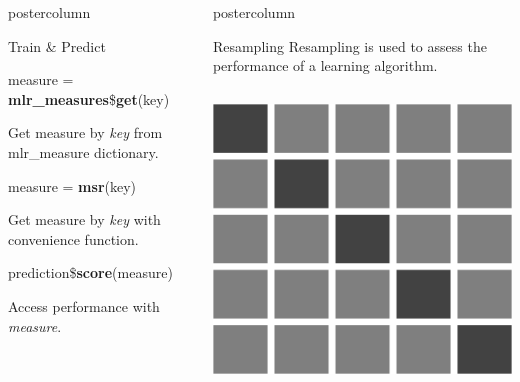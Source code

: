\documentclass{beamer}
\newlength{\columnheight} %
\begin{document}
\begin{frame}[fragile]{}
\begin{columns}
\begin{column}{.245\textwidth}
\begin{beamercolorbox}[center]{postercolumn}
\begin{minipage}{.98\textwidth}
{\begin{myblock}{Train \& Predict}
							\begin{codebox}
								measure = \textbf{mlr\_measures}\$\textbf{get}(key)
							\end{codebox}
							Get measure by \textit{key} from mlr\_measure dictionary.
							\\
							\begin{codebox}
								measure = \textbf{msr}(key)
							\end{codebox}
							Get measure by \textit{key} with convenience function.
							\\
							\begin{codebox}
								prediction\$\textbf{score}(measure)
							\end{codebox}
							Access performance with \textit{measure}.
						\end{myblock}
					}
				\end{minipage}
			\end{beamercolorbox}
		\end{column}
		\begin{column}{.245\textwidth}
			\begin{beamercolorbox}[center]{postercolumn}
				\begin{minipage}{.98\textwidth}
					\parbox[t][\columnheight]{\textwidth}{
						\begin{myblock}{Resampling}
							Resampling is used to assess the performance of a learning algorithm.
							\\[\baselineskip]
							\begin{minipage}{\textwidth}
								\begin{columns}[T]
									\begin{column}{0.2\textwidth}\leftskip=14pt
										\includegraphics[width=\textwidth]{img/cross_validation.png}

\end{column}
\end{columns}
\end{minipage}
\end{myblock}}
\end{minipage}
\end{beamercolorbox}
\end{column}
\end{columns}
\end{frame}
\end{document}
